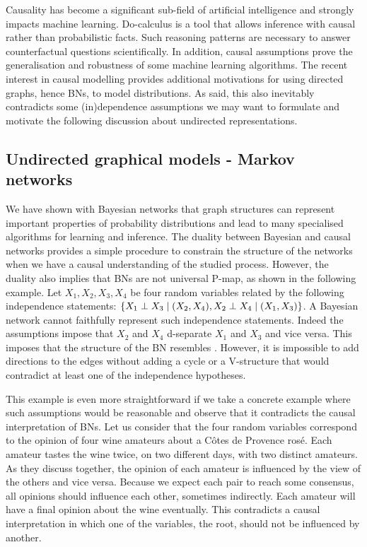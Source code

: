 Causality has become a significant sub-field of artificial intelligence and strongly impacts machine learning. Do-calculus \citep{pearl1994probabilistic} is a tool that allows inference with causal rather than probabilistic facts. Such reasoning patterns are necessary to answer counterfactual questions scientifically. In addition, causal assumptions prove the generalisation and robustness of some machine learning algorithms. The recent interest in causal modelling provides additional motivations for using directed graphs, hence BNs, to model distributions. As said, this also inevitably contradicts some (in)dependence assumptions we may want to formulate and motivate the following discussion about undirected representations.
\subsection{Undirected graphical models - Markov networks}
We have shown with Bayesian networks that graph structures can represent important properties of probability distributions and lead to many specialised algorithms for learning and inference. The duality between Bayesian and causal networks provides a simple procedure to constrain the structure of the networks when we have a causal understanding of the studied process. However, the duality also implies that BNs are not universal P-map, as shown in the following example. Let $X_1, X_2, X_3, X_4$ be four random variables related by the following independence statements: $\{ X_1 \perp X_3 \mid (X_2, X_4), X_2 \perp X_4 \mid (X_1, X_3)\}$. A Bayesian network cannot faithfully represent such independence statements. Indeed the assumptions impose that $X_2$ and $X_4$ d-separate $X_1$ and $X_3$ and vice versa. This imposes that the structure of the BN resembles . However, it is impossible to add directions to the edges without adding a cycle or a V-structure that would contradict at least one of the independence hypotheses.

This example is even more straightforward if we take a concrete example where such assumptions would be reasonable and observe that it contradicts the causal interpretation of BNs. Let us consider that the four random variables correspond to the opinion of four wine amateurs about a C{\^o}tes de Provence ros{\'e}. Each amateur tastes the wine twice, on two different days, with two distinct amateurs. As they discuss together, the opinion of each amateur is influenced by the view of the others and vice versa. Because we expect each pair to reach some consensus, all opinions should influence each other, sometimes indirectly.  Each amateur will have a final opinion about the wine eventually. This contradicts a causal interpretation in which one of the variables, the root, should not be influenced by another.

